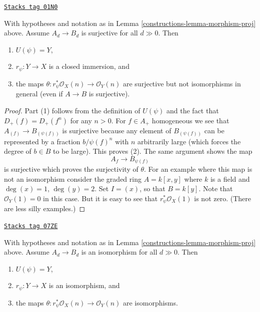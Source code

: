 \begin{lemma}
\label{constructions-lemma-surjective-graded-rings-map-proj}
\href{https://stacks.math.columbia.edu/tag/01N0}{\texttt{Stacks tag 01N0}}

With hypotheses and notation as in Lemma \ref{constructions-lemma-morphism-proj} above.
Assume $A_d \to B_d$ is surjective for all $d \gg 0$. Then
\begin{enumerate}
\item $U(\psi) = Y$,
\item $r_\psi : Y \to X$ is a closed immersion, and
\item the maps $\theta : r_\psi^*\mathcal{O}_X(n) \to \mathcal{O}_Y(n)$
are surjective but not isomorphisms in general (even if $A \to B$ is
surjective).
\end{enumerate}
\end{lemma}

\begin{proof}
Part (1) follows from the definition of $U(\psi)$ and the fact that
$D_{+}(f) = D_{+}(f^n)$ for any $n > 0$. For $f \in A_{+}$ homogeneous
we see that $A_{(f)} \to B_{(\psi(f))}$ is surjective because
any element of $B_{(\psi(f))}$ can be represented by a fraction
$b/\psi(f)^n$ with $n$ arbitrarily large (which forces the degree of
$b \in B$ to be large). This proves (2).
The same argument shows the map
$$
A_f \to B_{\psi(f)}
$$
is surjective which proves the surjectivity of $\theta$.
For an example where this map is not an isomorphism
consider the graded ring $A = k[x, y]$ where $k$ is a field
and $\deg(x) = 1$, $\deg(y) = 2$. Set $I = (x)$, so that
$B = k[y]$. Note that $\mathcal{O}_Y(1) = 0$ in this case.
But it is easy to see that $r_\psi^*\mathcal{O}_X(1)$
is not zero. (There are less silly examples.)
\end{proof}

\begin{lemma}
\label{constructions-lemma-eventual-iso-graded-rings-map-proj}
\href{https://stacks.math.columbia.edu/tag/07ZE}{\texttt{Stacks tag 07ZE}}

With hypotheses and notation as in Lemma \ref{constructions-lemma-morphism-proj} above.
Assume $A_d \to B_d$ is an isomorphism for all $d \gg 0$. Then
\begin{enumerate}
\item $U(\psi) = Y$,
\item $r_\psi : Y \to X$ is an isomorphism, and
\item the maps $\theta : r_\psi^*\mathcal{O}_X(n) \to \mathcal{O}_Y(n)$
are isomorphisms.
\end{enumerate}
\end{lemma}


